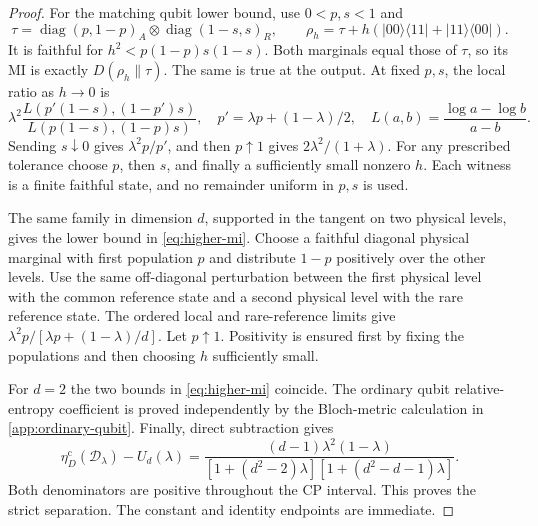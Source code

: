 \documentclass[11pt]{article}
\numberwithin{equation}{section}
\theoremstyle{definition}
\theoremstyle{remark}
\DeclareMathOperator{\diag}{diag}
\newcommand{\D}{\mathcal D}
\newcommand{\ket}[1]{\lvert #1\rangle}
\newcommand{\bra}[1]{\langle #1\rvert}
\newcommand{\etaC}{\eta_D^{\mathrm c}}
\begin{document}
\begin{proof}
For the matching qubit lower bound, use $0<p,s<1$ and
\[
 \tau=\diag(p,1-p)_A\otimes\diag(1-s,s)_R,\qquad
 \rho_h=\tau+h(\ket{00}\bra{11}+\ket{11}\bra{00}).
\]
It is faithful for $h^2<p(1-p)s(1-s)$. Both marginals equal those
of $\tau$, so its MI is exactly $D(\rho_h\|\tau)$.
The same is true at the output. At fixed $p,s$, the local ratio as
$h\to0$ is
\[
 \lambda^2
 \frac{L(p'(1-s),(1-p')s)}{L(p(1-s),(1-p)s)},\quad
 p'=\lambda p+(1-\lambda)/2,\quad
 L(a,b)=\frac{\log a-\log b}{a-b}.
\]
Sending $s\downarrow0$ gives $\lambda^2p/p'$, and then
$p\uparrow1$ gives $2\lambda^2/(1+\lambda)$.
For any prescribed tolerance choose $p$, then $s$, and finally a
sufficiently small nonzero $h$. Each witness is a finite faithful state,
and no remainder uniform in $p,s$ is used.

The same family in dimension $d$, supported in the tangent on two
physical levels, gives the lower bound in \eqref{eq:higher-mi}.
Choose a faithful diagonal physical marginal with first population $p$
and distribute $1-p$ positively over the other levels.
Use the same off-diagonal perturbation between the first physical
level with the common reference state and a second physical level
with the rare reference state. The ordered local and rare-reference
limits give
$\lambda^2p/[\lambda p+(1-\lambda)/d]$.
Let $p\uparrow1$. Positivity is ensured first by fixing the populations
and then choosing $h$ sufficiently small.

For $d=2$ the two bounds in \eqref{eq:higher-mi} coincide.
The ordinary qubit relative-entropy coefficient is proved independently
by the Bloch-metric calculation in \cref{app:ordinary-qubit}.
Finally, direct subtraction gives
\[
 \etaC(\D_\lambda)-U_d(\lambda)
 =\frac{(d-1)\lambda^2(1-\lambda)}
 {[1+(d^2-2)\lambda][1+(d^2-d-1)\lambda]} .
\]
Both denominators are positive throughout the CP interval.
This proves the strict separation. The constant and identity endpoints
are immediate.
\end{proof}
\end{document}
